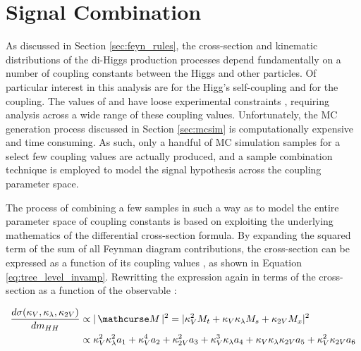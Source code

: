 \section{Signal Combination}

    As discussed in Section \ref{sec:feyn_rules}, the cross-section and kinematic distributions of the di-Higgs production processes depend fundamentally on a number of coupling constants between the Higgs and other particles.
    Of particular interest in this analysis are \kl for the Higg's self-coupling and \kvv for the \HHVV coupling.
    The values of \kl and \kvv have loose experimental constraints \cite{EXOT-2016-31} \cite{HDBS-2018-18-witherratum} \cite{ATLAS-CONF-2019-049},
        requiring analysis across a wide range of these coupling values.
    Unfortunately, the MC generation process discussed in Section \ref{sec:mcsim} is computationally expensive and time consuming.
    As such, only a handful of MC simulation samples for a select few coupling values are actually produced,
        and a sample combination technique is employed to model the signal hypothesis across the coupling parameter space.

    The process of combining a few samples in such a way as to model the entire parameter space of coupling constants is based on exploiting the underlying mathematics of the differential cross-section formula.
    By expanding the squared term of the sum of all Feynman diagram contributions,
        the cross-section can be expressed as a function of its coupling values \cite{ATLAS-CONF-2019-049}, as shown in Equation \ref{eq:tree_level_invamp}.
    Rewritting the expression again in terms of the cross-section as a function of the observable \mhh:

    \begin{equation} \begin{split} \label{eq:tree_level_invamp_simple}
        \dXsecM &\propto |\invAmp|^2 = |  \kv^2 M_t + \kv \kl M_s + \kvv M_x |^2 \\
        &\propto \kv^2 \kl^2 a_1 + \kv^4 a_2 + \kvv^2 a_3 + \kv^3 \kl a_4 + \kv \kl \kvv a_5 + \kv^2 \kvv a_6
    \end{split} \end{equation}

